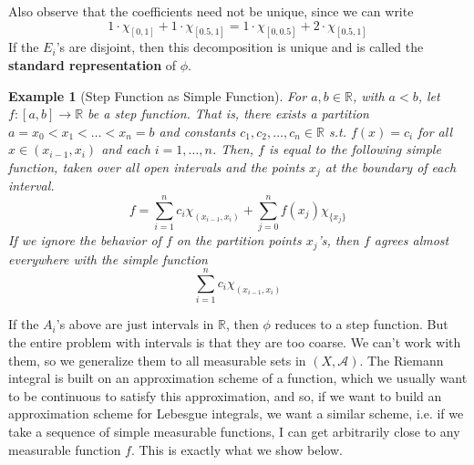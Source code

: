 \documentclass{article}
\newtheorem{example}{Example}[section]
\theoremstyle{remark}
\theoremstyle{definition}
\begin{document}
Also observe that the coefficients need not be unique, since we can write 
\[1 \cdot \chi_{[0, 1]} + 1 \cdot \chi_{[0.5, 1]} = 1 \cdot \chi_{[0, 0.5]} + 2 \cdot \chi_{[0.5, 1]}\]
If the $E_i$'s are disjoint, then this decomposition is unique and is called the \textbf{standard representation} of $\phi$. 

\begin{example}[Step Function as Simple Function]
For $a, b \in \mathbb{R}$, with $a < b$, let $f: [a, b] \longrightarrow \mathbb{R}$ be a step function. That is, there exists a partition $a = x_0 < x_1 < \ldots < x_n = b$ and constants $c_1, c_2, \ldots, c_n \in \mathbb{R}$ s.t. $f(x) = c_i$ for all $x \in (x_{i-1}, x_i)$ and each $i = 1, \ldots, n$. Then, $f$ is equal to the following simple function, taken over all open intervals and the points $x_j$ at the boundary of each interval. 
\[f = \sum_{i=1}^n c_i \chi_{(x_{i-1}, x_i)} + \sum_{j=0}^n f(x_j) \chi_{\{x_j\}}\]
If we ignore the behavior of $f$ on the partition points $x_j$'s, then $f$ agrees almost everywhere with the simple function 
\[\sum_{i=1}^n c_i \chi_{(x_{i-1}, x_i)}\]
\end{example}

If the $A_i$'s above are just intervals in $\mathbb{R}$, then $\phi$ reduces to a step function. But the entire problem with intervals is that they are too coarse. We can't work with them, so we generalize them to all measurable sets in $(X, \mathcal{A})$. The Riemann integral is built on an approximation scheme of a function, which we usually want to be continuous to satisfy this approximation, and so, if we want to build an approximation scheme for Lebesgue integrals, we want a similar scheme, i.e. if we take a sequence of simple measurable functions, I can get arbitrarily close to any measurable function $f$. This is exactly what we show below. 
\end{document}
